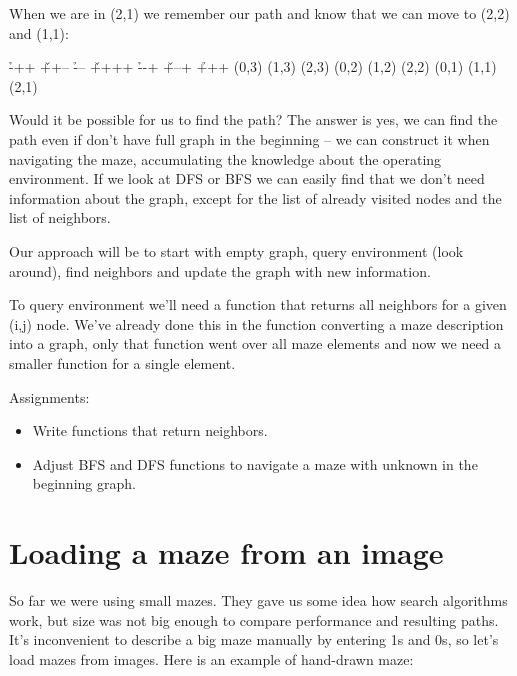 When we are in (2,1) we remember our path and know that we can 
move to (2,2) and (1,1):

\begin{labyrinth}{3}{4}
        \h -++
\v ++-- \h ---
\v ++++ \h --+
\v +--+ \h +++
\putsymbol(0,3){}
\putsymbol(1,3){}
\putsymbol(2,3){}
\putsymbol(0,2){}
\putsymbol(1,2){}
\putsymbol(2,2){}
\putsymbol(0,1){}
\putsymbol(1,1){}
\putsymbol(2,1){}
\end{labyrinth}


Would it be possible for us to find the path? The answer
is yes, we can find the path even if don't have full graph
in the beginning -- we can construct it when navigating the
maze, accumulating the knowledge about the operating environment.
If we look at DFS or BFS we can easily find that we don't
need information about the graph, except for the list of
already visited nodes and the list of neighbors.

Our approach will be to start with empty graph,
query environment (look around),
find neighbors and update the graph with new information.

To query environment we'll need a function that returns
all neighbors for a given (i,j) node. We've already done
this in the function converting a maze description into
a graph, only that function went over all maze elements
and now we need a smaller function for a single element.

\begin{tcolorbox}
Assignments:
\begin{itemize}
\item Write functions that return neighbors.
\item Adjust BFS and DFS functions to navigate a maze
with unknown in the beginning graph.
\end{itemize}
\end{tcolorbox}

\section{Loading a maze from an image}

So far we were using small mazes. They gave us some idea
how search algorithms work, but size was not big enough
to compare performance and resulting paths. It's inconvenient
to describe a big maze manually by entering 1s and 0s, so
let's load mazes from images. Here is an example of hand-drawn
maze:

